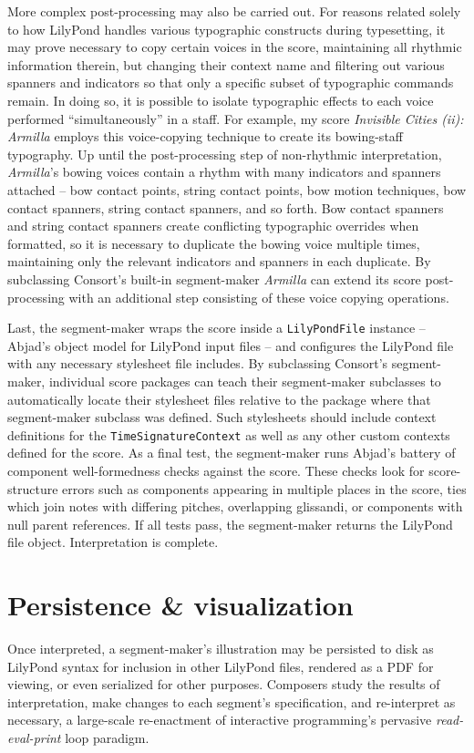 More complex post-processing may also be carried out. For reasons related
solely to how LilyPond handles various typographic constructs during
typesetting, it may prove necessary to copy certain voices in the score,
maintaining all rhythmic information therein, but changing their context name
and filtering out various spanners and indicators so that only a specific
subset of typographic commands remain. In doing so, it is possible to isolate
typographic effects to each voice performed \enquote{simultaneously} in a
staff. For example, my score \emph{Invisible Cities (ii): Armilla} employs this
voice-copying technique to create its bowing-staff typography. Up until the
post-processing step of non-rhythmic interpretation, \emph{Armilla}'s bowing
voices contain a rhythm with many indicators and spanners attached -- bow
contact points, string contact points, bow motion techniques, bow contact
spanners, string contact spanners, and so forth. Bow contact spanners and
string contact spanners create conflicting typographic overrides when
formatted, so it is necessary to duplicate the bowing voice multiple times,
maintaining only the relevant indicators and spanners in each duplicate. By
subclassing Consort's built-in segment-maker \emph{Armilla} can extend its
score post-processing with an additional step consisting of these voice copying
operations.

Last, the segment-maker wraps the score inside a \texttt{LilyPondFile} instance
-- Abjad's object model for LilyPond input files -- and configures the LilyPond
file with any necessary stylesheet file includes. By subclassing Consort's
segment-maker, individual score packages can teach their segment-maker
subclasses to automatically locate their stylesheet files relative to the
package where that segment-maker subclass was defined. Such stylesheets should
include context definitions for the \texttt{TimeSignatureContext} as well as
any other custom contexts defined for the score. As a final test, the
segment-maker runs Abjad's battery of component well-formedness checks against
the score. These checks look for score-structure errors such as components
appearing in multiple places in the score, ties which join notes with differing
pitches, overlapping glissandi, or components with null parent references. If
all tests pass, the segment-maker returns the LilyPond file object.
Interpretation is complete.

\section{Persistence \& visualization}
\label{sec:persistence-and-visualization}

Once interpreted, a segment-maker's illustration may be persisted to disk as
LilyPond syntax for inclusion in other LilyPond files, rendered as a PDF for
viewing, or even serialized for other purposes. Composers study the results of
interpretation, make changes to each segment's specification, and re-interpret
as necessary, a large-scale re-enactment of interactive programming's pervasive
\emph{read-eval-print} loop paradigm.